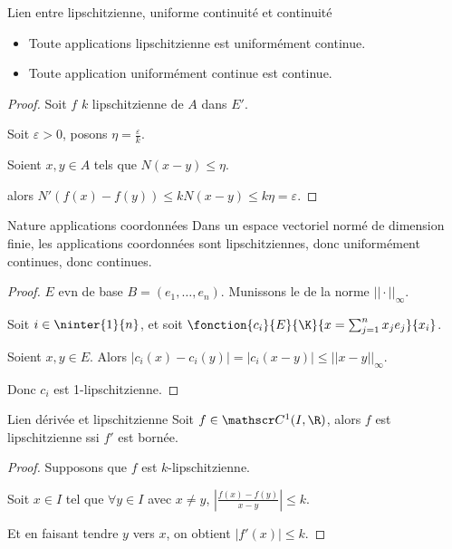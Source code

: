 \begin{proposition}{Lien entre lipschitzienne, uniforme continuité et continuité}{}
    \begin{itemize}
        \item Toute applications lipschitzienne est uniformément continue. 

        \item Toute application uniformément continue est continue.
    \end{itemize}
\end{proposition}


\begin{proof}
    Soit $f$ $k$ lipschitzienne de $A$ dans $E'$.

    Soit $\varepsilon > 0$, posons $\eta = \frac \varepsilon k$.

    Soient $x, y \in A$ tels que $N(x - y) \leqslant \eta$.

    alors $N'(f(x) - f(y)) \leqslant k N(x - y) \leqslant k \eta = \varepsilon$.
\end{proof}

\begin{proposition}{Nature applications coordonnées}{}
    Dans un espace vectoriel normé de dimension finie, les applications coordonnées sont lipschitziennes, 
    donc uniformément continues, donc continues. 
\end{proposition}

\begin{proof}
    $E$ evn de base $B = (e_1, \ldots, e_n)$. Munissons le de la norme $||\cdot||_\infty$.

    Soit $i \in \ninter{1}{n}$, et soit $\fonction{c_i}{E}{\K}{x = \sum_{j=1}^n x_j e_j}{x_i}$.

    Soient $x, y \in E$. Alors $|c_i(x) - c_i(y)| = |c_i(x - y) | \leqslant ||x - y||_\infty$.

    Donc $c_i$ est 1-lipschitzienne. 
\end{proof}

\begin{theoreme}{Lien dérivée et lipschitzienne}{}
    Soit $f \in \mathscr C^1(I, \R)$, alors $f$ est lipschitzienne ssi $f'$ est bornée.
\end{theoreme}

\begin{proof}
    Supposons que $f$ est $k$-lipschitzienne. 

    Soit $x \in I$ tel que $\forall y \in I$ avec $x \neq y$, $\left|\frac{f(x) - f(y) }{x - y}\right| \leqslant k$. 

    Et en faisant tendre $y$ vers $x$, on obtient $|f'(x)| \leqslant k$.
\end{proof}

